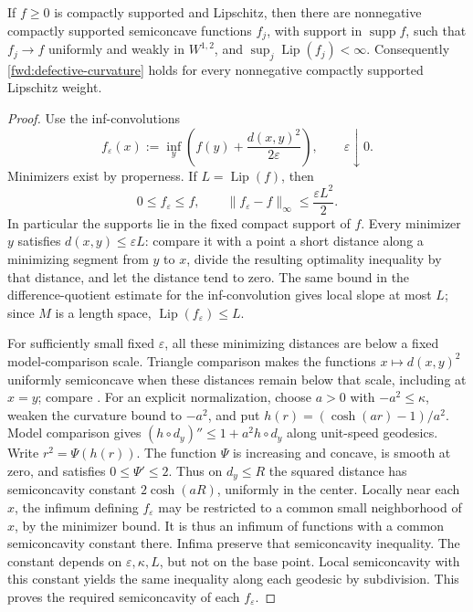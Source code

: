 \begin{lemma}
\label{fwd:weight-approximation}
If \(f\geq0\) is compactly supported and Lipschitz, then there are
nonnegative compactly supported semiconcave functions \(f_j\), with
support in \(\operatorname{supp}f\), such that \(f_j\to f\)
uniformly and weakly in \(W^{1,2}\), and
\(\sup_j\operatorname{Lip}(f_j)<\infty\). Consequently
\eqref{fwd:defective-curvature} holds for every nonnegative compactly
supported Lipschitz weight.
\end{lemma}

\begin{proof}
Use the inf-convolutions
\[
 f_\varepsilon(x)
 :=\inf_y\left(f(y)+\frac{d(x,y)^2}{2\varepsilon}\right),
 \qquad\varepsilon\downarrow0.
\]
Minimizers exist by properness. If \(L=\operatorname{Lip}(f)\), then
\[
 0\leq f_\varepsilon\leq f,
 \qquad \|f_\varepsilon-f\|_\infty\leq\frac{\varepsilon L^2}{2}.
\]
In particular the supports lie in the fixed compact support of \(f\).
Every minimizer \(y\) satisfies \(d(x,y)\leq\varepsilon L\):
compare it with a point a short distance along a minimizing segment
from \(y\) to \(x\), divide the resulting optimality inequality by
that distance, and let the distance tend to zero. The same bound
in the difference-quotient estimate for the inf-convolution gives
local slope at most \(L\); since \(M\) is a length space,
\(\operatorname{Lip}(f_\varepsilon)\leq L\).

For sufficiently small fixed \(\varepsilon\), all these minimizing
distances are below a fixed model-comparison scale. Triangle
comparison makes the functions \(x\mapsto d(x,y)^2\) uniformly
semiconcave when these distances remain below that scale, including
at \(x=y\); compare \cite[Section~1.2]{Petrunin2007}.
For an explicit normalization, choose \(a>0\) with
\(-a^2\le\kappa\), weaken the curvature bound to \(-a^2\), and put \(h(r)=(\cosh(ar)-1)/a^2\). Model comparison
gives \((h\circ d_y)''\le1+a^2h\circ d_y\) along unit-speed
geodesics. Write \(r^2=\Psi(h(r))\). The function \(\Psi\) is
increasing and concave, is smooth at zero, and satisfies
\(0\le\Psi'\le2\). Thus on \(d_y\le R\) the squared distance has
semiconcavity constant \(2\cosh(aR)\), uniformly in the center. Locally near each \(x\), the
infimum defining \(f_\varepsilon\) may be restricted to a common
small neighborhood of \(x\), by the minimizer bound. It is thus
an infimum of functions with a common semiconcavity constant there.
Infima preserve that semiconcavity inequality. The constant depends
on \(\varepsilon,\kappa,L\), but not on the base point. Local
semiconcavity with this constant yields the same inequality along
each geodesic by subdivision. This proves the required
semiconcavity of each \(f_\varepsilon\).


\end{proof}
